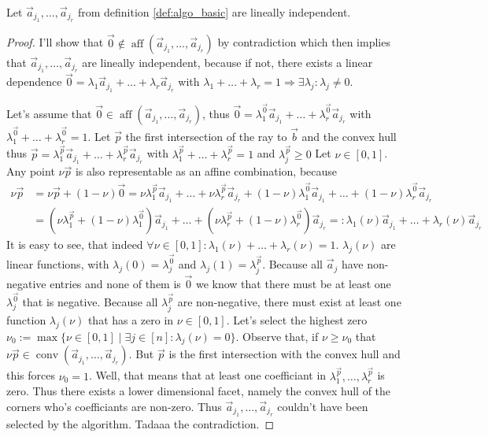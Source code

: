 \begin{lemma}
    \label{lemma:vertecies_are_basis}
    Let $\vec a_{j_1}, \dots, \vec a_{j_r}$ from definition \ref{def:algo_basic} are lineally independent.
\end{lemma}
\begin{proof}
    I'll show that $\vec 0 \notin \operatorname{aff}(\vec a_{j_1}, \dots, \vec a_{j_r})$ by contradiction which then implies that $\vec a_{j_1}, \dots, \vec a_{j_r}$ are lineally independent, because if not, there exists a linear dependence $\vec 0 = \lambda_1\vec a_{j_1} + \dots + \lambda_r\vec a_{j_r}$ with $\lambda_1 + \dots + \lambda_r = 1 \Rightarrow\exists\lambda_j\colon\lambda_j \neq 0$. 
    
    Let's assume that $\vec 0 \in \operatorname{aff}(\vec a_{j_1}, \dots, \vec a_{j_r})$, thus $\vec 0 = \lambda^{\vec 0}_1 \vec a_{j_1} + \dots + \lambda^{\vec 0}_r \vec a_{j_r}$ with $\lambda^{\vec 0}_1 + \dots + \lambda^{\vec 0}_r = 1$. Let $\vec p$ the first intersection of the ray to $\vec b$ and the convex hull thus $\vec p = \lambda^{\vec p}_1 \vec a_{j_1} + \dots + \lambda^{\vec p}_r \vec a_{j_r}$ with $\lambda^{\vec p}_1 + \dots + \lambda^{\vec p}_r = 1$ and $\lambda^{\vec p}_j \geq 0$ Let $\nu \in [0, 1]$. Any point $\nu\vec p$ is also representable as an affine combination, because
    \begin{align*}
        \nu \vec p &= \nu \vec p + (1-\nu)\vec 0 = \nu\lambda^{\vec p}_1 \vec a_{j_1} + \dots + \nu\lambda^{\vec p}_r \vec a_{j_r} + (1-\nu)\lambda^{\vec 0}_1 \vec a_{j_1} + \dots + (1-\nu)\lambda^{\vec 0}_r \vec a_{j_r}\\
        &=(\nu\lambda^{\vec p}_1 + (1-\nu)\lambda^{\vec 0}_1)\vec a_{j_1} + \dots + (\nu\lambda^{\vec p}_r + (1-\nu)\lambda^{\vec 0}_r)\vec a_{j_r} =: \lambda_1(\nu)\vec a_{j_1} + \dots + \lambda_r(\nu)\vec a_{j_r}
    \end{align*}
    It is easy to see, that indeed $\forall \nu\in[0, 1]: \lambda_1(\nu) + \dots + \lambda_r(\nu) = 1$. $\lambda_j(\nu)$ are linear functions, with $\lambda_j(0) = \lambda_j^{\vec 0}$ and $\lambda_j(1) = \lambda_j^{\vec p}$. Because all $\vec a_j$ have non-negative entries and none of them is $\vec 0$ we know that there must be at least one $\lambda_j^{\vec 0}$ that is negative. Because all $\lambda_j^{\vec p}$ are non-negative, there must exist at least one function $\lambda_j(\nu)$ that has a zero in $\nu \in [0, 1]$. Let's select the highest zero $\nu_0 := \max\{\nu \in [0, 1]\mid \exists j\in [n]\colon \lambda_j(\nu) = 0\}$. Observe that, if $\nu \geq \nu_0$ that $\nu\vec p \in \operatorname{conv}(\vec a_{j_1}, \dots, \vec a_{j_r})$. But $\vec p$ is the first intersection with the convex hull and this forces $\nu_0 = 1$. Well, that means that at least one coefficiant in $\lambda^{\vec p}_1, \dots, \lambda^{\vec p}_r$ is zero. Thus there exists a lower dimensional facet, namely the convex hull of the corners who's coefficiants are non-zero. Thus $\vec a_{j_1}, \dots, \vec a_{j_r}$ couldn't have been selected by the algorithm. Tadaaa the contradiction.
\end{proof}

